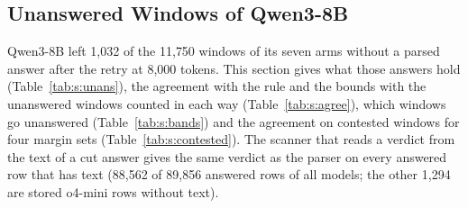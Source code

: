\subsection{Unanswered Windows of Qwen3-8B}
\label{sec:s:open:unans}

Qwen3-8B left 1{,}032 of the 11{,}750 windows of its seven arms without a parsed answer after the retry at 8{,}000 tokens. This section gives what those answers hold (Table~\ref{tab:s:unans}), the agreement with the rule and the bounds with the unanswered windows counted in each way (Table~\ref{tab:s:agree}), which windows go unanswered (Table~\ref{tab:s:bands}) and the agreement on contested windows for four margin sets (Table~\ref{tab:s:contested}). The scanner that reads a verdict from the text of a cut answer gives the same verdict as the parser on every answered row that has text (88{,}562 of 89{,}856 answered rows of all models; the other 1{,}294 are stored o4-mini rows without text).

